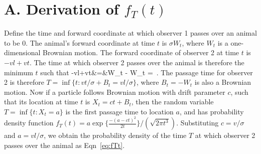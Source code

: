 \documentclass[useAMS, usenatbib, referee]{biom}\usepackage[]{graphicx}\usepackage[]{color}
\begin{document}


\appendix

\section{A. Derivation of $f_{T}(t)$}
\label{appx:firstpassage}

Define the time and forward coordinate at which observer 1 passes over an animal to be 0. The animal's forward coordinate at time $t$ is $\sigma W_t$, where $W_t$ is a one-dimensional Brownian motion. The forward coordinate of observer 2 at time $t$ is $-vl+vt$. The time at which observer 2 passes over the animal is therefore the minimum $t$ such that
\be
-vl+vt&=&\sigma W_t \;\;\;\Rightarrow \;\;\; - W_t \;=\; \,.
\ee
\noindent
The passage time for observer 2 is therefore $T=\inf\{t: vt/\sigma + B_t = vl/\sigma\}$, where $B_t=-W_t$ is also a Brownian motion. Now if a particle follows Brownian motion with drift parameter $c$, such that its location at time $t$ is $X_t=ct+B_t$, then the random variable $T=\inf\{t: X_t=a\}$ is the first passage time to location $a$, and has probability density function $f_{T} (t) = a \exp \Big\{ \frac{- (a-ct)^2}{2t} \Big\} / (\sqrt{2 \pi t^3})$. Substituting $c=v/\sigma$ and $a=vl/\sigma$, we obtain the probability density of the time $T$ at which observer 2 passes over the animal as Eqn~\eqref{eq:fTt}.
\end{document}
